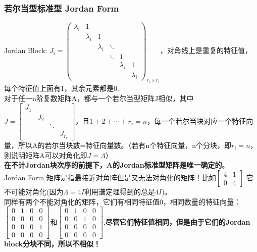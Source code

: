     \subsubsection{若尔当型标准型 Jordan Form}
    Jordan Block: $J_{i}=\left(\begin{array}{cccccc}{\lambda_{i}} & {1} & {} & {} & {} \\ {} & {\lambda_{i}} & {1} & {} & {} &{} \\ {} & {} & {\lambda_{i}} & {\ddots} & {}&{} \\ {} & {} & {} & {\ddots} & {1}&{} \\ {} & {} & {} &{} & {\lambda_{i}} & {1} \\ {}&{} & {} & {} & {} & {\lambda_{i}}\end{array}\right)_{r_{i}\times r_{i}}$，对角线上是重复的特征值，每个特征值上面有1，其余元素都是0.
    \\
    对于任一n阶复数矩阵A，都与一个若尔当型矩阵J相似，其中$J=\left[\begin{array}{cccc} J_{1} & & & \\ &J_{2} & & \\ & &  \ddots &\\  & & & J_{r_{i}}
    \end{array}\right]$，且$1+2+\cdots +r_{i}=n$，每一个若尔当块对应一个特征向量，所以A的若尔当块数=特征向量数。（若有n个特征向量，n个分块，即$r_{i}=n$，则说明矩阵A可以对角化即$J=\Lambda$）
    \\
    \textbf{在不计Jordan块次序的前提下，A的Jordan标准型矩阵是唯一确定的}。
    \\
    Jordan Form 矩阵是指最接近对角阵但是又无法对角化的矩阵！比如$\begin{bmatrix}4 & 1 \\ 0 & 4\end{bmatrix}$ 它不可能对角化(因为$\Lambda = 4I$利用谱定理得到的总是$4I$)。\\
    同样有两个不能对角化的矩阵，它们有相同特征值0，相同数量的特征向量：$\left[\begin{array}{lll|l}{0} & {1} & {0} & {0} \\ {0} & {0} & {0} & {0}\\{0}&{0} & {0} & {1} \\ \hline {0}&{0} & {0} & {0}\end{array}\right]$和$\left[\begin{array}{ll|ll}{0} & {1} & {0} & {0} \\ {0} & {0} & {1} & {0} \\ \hline {0}&{0} & {0} & {0} \\{0}&{0} & {0} & {0}\end{array}\right]$,\textbf{尽管它们特征值相同，但是由于它们的Jordan block分块不同，所以不相似！}



